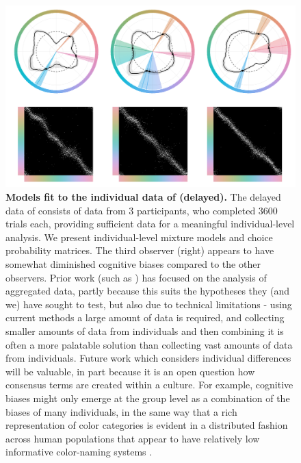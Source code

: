 \documentclass[9pt,biorxiv,lineno,onehalfspacing]{lapreprint}
\begin{document}
\begin{figure}
    \centering
    \begin{fullwidth}
    \includegraphics[width=\textwidth+4cm]{Outputs/Paper/Figures/flat/SI_Bae_indi.png}
    \caption{\textbf{Models fit to the individual data of \citet{bae_why_2015} (delayed).}
    The delayed data of \citep{bae_why_2015} consists of data from 3 participants, who completed 3600 trials each, providing sufficient data for a meaningful individual-level analysis.
    We present individual-level mixture models and choice probability matrices.
    The third observer (right) appears to have somewhat diminished cognitive biases compared to the other observers.
    Prior work (such as \citep{bae_why_2015}) has focused on the analysis of aggregated data, partly because this suits the hypotheses they (and we) have sought to test, but also due to technical limitations - using current methods a large amount of data is required, and collecting smaller amounts of data from individuals and then combining it is often a more palatable solution than collecting vast amounts of data from individuals.
    Future work which considers individual differences will be valuable, in part because it is an open question how consensus terms are created within a culture. For example, cognitive biases might only emerge at the group level as a combination of the biases of many individuals, in the same way that a rich representation of color categories is evident in a distributed fashion across human populations that appear to have relatively low informative color-naming systems \citep{lindsey_hunter-gatherer_2015,gibson_color_2017}.
    } 
    \label{fig:Bae_indi}
    \end{fullwidth}
\end{figure}
\end{document}
